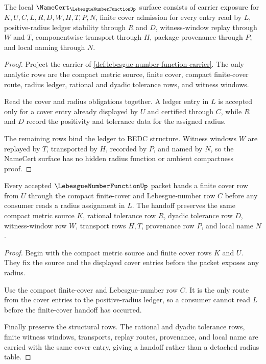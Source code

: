 \begin{theorem}
\label{thm:lebesgue-number-function-namecert-obligations}
The local $\NameCert_{\LebesgueNumberFunctionUp}$ surface consists of carrier exposure for $K,U,C,L,R,D,W,H,T,P,N$, finite cover admission for every entry read by $L$, positive-radius ledger stability through $R$ and $D$, witness-window replay through $W$ and $T$, componentwise transport through $H$, package provenance through $P$, and local naming through $N$.
\end{theorem}
\begin{proof}
Project the carrier of \autoref{def:lebesgue-number-function-carrier}. The only analytic rows are the compact metric source, finite cover, compact finite-cover route, radius ledger, rational and dyadic tolerance rows, and witness windows.

Read the cover and radius obligations together. A ledger entry in $L$ is accepted only for a cover entry already displayed by $U$ and certified through $C$, while $R$ and $D$ record the positivity and tolerance data for the assigned radius.

The remaining rows bind the ledger to BEDC structure. Witness windows $W$ are replayed by $T$, transported by $H$, recorded by $P$, and named by $N$, so the NameCert surface has no hidden radius function or ambient compactness proof.
\end{proof}

\begin{theorem}
\label{thm:lebesgue-number-function-finite-cover-handoff}
Every accepted $\LebesgueNumberFunctionUp$ packet hands a finite cover row from $U$ through the compact finite-cover and Lebesgue-number row $C$ before any consumer reads a radius assignment in $L$. The handoff preserves the same compact metric source $K$, rational tolerance row $R$, dyadic tolerance row $D$, witness-window row $W$, transport rows $H,T$, provenance row $P$, and local name $N$.
\end{theorem}
\begin{proof}
Begin with the compact metric source and finite cover rows $K$ and $U$. They fix the source and the displayed cover entries before the packet exposes any radius.

Use the compact finite-cover and Lebesgue-number row $C$. It is the only route from the cover entries to the positive-radius ledger, so a consumer cannot read $L$ before the finite-cover handoff has occurred.

Finally preserve the structural rows. The rational and dyadic tolerance rows, finite witness windows, transports, replay routes, provenance, and local name are carried with the same cover entry, giving a handoff rather than a detached radius table.
\end{proof}

